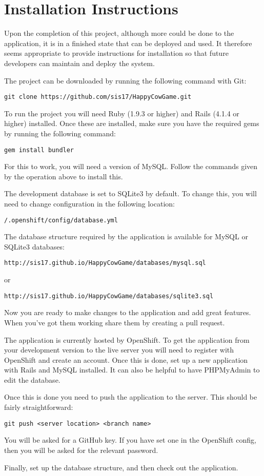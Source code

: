 \chapter{Installation Instructions}
Upon the completion of this project, although more could be done to the application, it is in a finished state that can be deployed and used. It therefore seems appropriate to provide instructions for installation so that future developers can maintain and deploy the system.

The project can be downloaded by running the following command with Git:
\begin{verbatim}
git clone https://github.com/sis17/HappyCowGame.git
\end{verbatim}

To run the project you will need Ruby (1.9.3 or higher) and Rails (4.1.4 or higher) installed. Once these are installed, make sure you have the required gems by running the following command:
\begin{verbatim}
gem install bundler
\end{verbatim}

For this to work, you will need a version of MySQL. Follow the commands given by the operation above to install this.

The development database is set to SQLite3 by default. To change this, you will need to change configuration in the following location:
\begin{verbatim}
/.openshift/config/database.yml
\end{verbatim}

The database structure required by the application is available for MySQL or SQLite3 databases: 
\begin{verbatim}
http://sis17.github.io/HappyCowGame/databases/mysql.sql
\end{verbatim}
or
\begin{verbatim}
http://sis17.github.io/HappyCowGame/databases/sqlite3.sql
\end{verbatim}

Now you are ready to make changes to the application and add great features. When you've got them working share them by creating a pull request.

The application is currently hosted by OpenShift. To get the application from your development version to the live server you will need to register with OpenShift and create an account. Once this is done, set up a new application with Rails and MySQL installed. It can also be helpful to have PHPMyAdmin to edit the database.

Once this is done you need to push the application to the server. This should be fairly straightforward:
\begin{verbatim}
git push <server location> <branch name>
\end{verbatim}

You will be asked for a GitHub key. If you have set one in the OpenShift config, then you will be asked for the relevant password.

Finally, set up the database structure, and then check out the application.